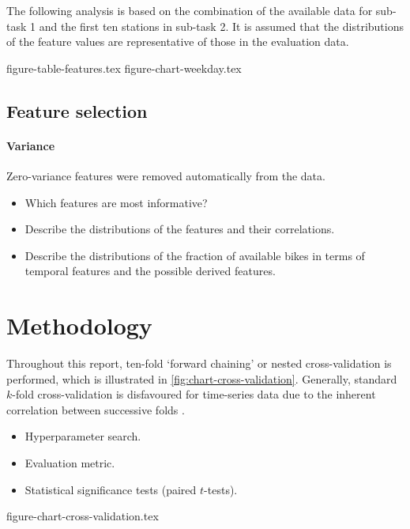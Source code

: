 \documentclass[11pt]{extarticle}
\begin{document}
The following analysis is based on the combination of the available data for sub-task 1
and the first ten stations in sub-task 2.
It is assumed that the distributions of the feature values are representative of those
in the evaluation data.

{figure-table-features.tex}
{figure-chart-weekday.tex}

\subsection{Feature selection}

\paragraph{Variance}

Zero-variance features were removed automatically from the data.

\begin{itemize}
  \item Which features are most informative?
  \item Describe the distributions of the features and their correlations.
  \item Describe the distributions of the fraction of available bikes in terms of
        temporal features and the possible derived features.
\end{itemize}

\section{Methodology}

Throughout this report, ten-fold `forward chaining' or nested cross-validation is
performed, which is illustrated in \cref{fig:chart-cross-validation}.
Generally, standard $k$-fold cross-validation is disfavoured for time-series data due
to the inherent correlation between successive folds \parencite{Bergmeir2018}.

\begin{itemize}
  \item Hyperparameter search.
  \item Evaluation metric.
  \item Statistical significance tests (paired $t$-tests).
\end{itemize}

{figure-chart-cross-validation.tex}

\printbibliography
\end{document}

